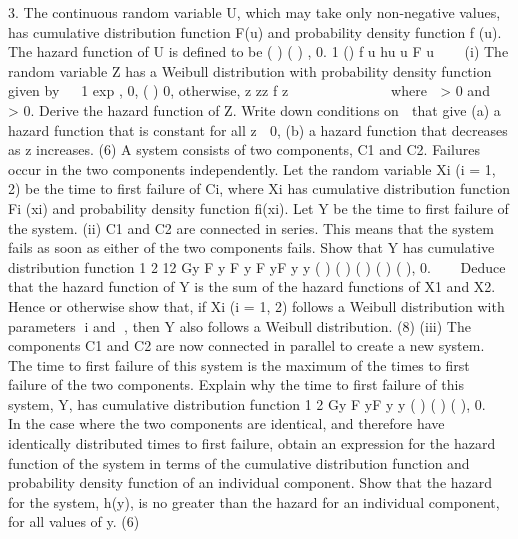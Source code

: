 3. The continuous random variable U, which may take only non-negative values, has
cumulative distribution function F(u) and probability density function f (u). The
hazard function of U is defined to be
( ) ( ) , 0. 1 ()
f u hu u
F u
  
(i) The random variable Z has a Weibull distribution with probability density
function given by
  1 exp , 0, ( ) 0, otherwise,
z zz f z
         

where  > 0 and  > 0. Derive the hazard function of Z. Write down
conditions on  that give
(a) a hazard function that is constant for all z  0,
(b) a hazard function that decreases as z increases.
(6)
A system consists of two components, C1 and C2. Failures occur in the two
components independently. Let the random variable Xi (i = 1, 2) be the time to first
failure of Ci, where Xi has cumulative distribution function Fi (xi) and probability
density function fi(xi). Let Y be the time to first failure of the system.
(ii) C1 and C2 are connected in series. This means that the system fails as soon as
either of the two components fails. Show that Y has cumulative distribution
function
1 2 12 Gy F y F y F yF y y ( ) ( ) ( ) ( ) ( ), 0.  
Deduce that the hazard function of Y is the sum of the hazard functions of X1
and X2. Hence or otherwise show that, if Xi (i = 1, 2) follows a Weibull
distribution with parameters i and , then Y also follows a Weibull
distribution.
(8)
(iii) The components C1 and C2 are now connected in parallel to create a new
system. The time to first failure of this system is the maximum of the times to
first failure of the two components. Explain why the time to first failure of this
system, Y, has cumulative distribution function
1 2 Gy F yF y y ( ) ( ) ( ), 0.  
In the case where the two components are identical, and therefore have
identically distributed times to first failure, obtain an expression for the hazard
function of the system in terms of the cumulative distribution function and
probability density function of an individual component. Show that the hazard
for the system, h(y), is no greater than the hazard for an individual component,
for all values of y.
(6) 
